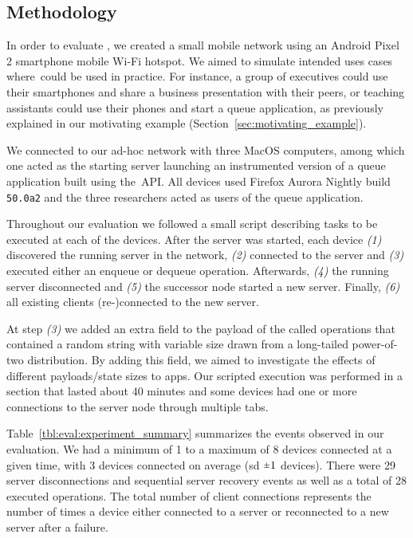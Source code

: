 \subsection{Methodology}
\label{sub:eval:evaluation_methodology}

In order to evaluate \APINameNoSpace, we created a small mobile network using an Android Pixel 2 smartphone mobile Wi-Fi hotspot.
We aimed to simulate intended uses cases where~\APIName could be used in practice. 
For instance, a group of executives could use their smartphones and share a business presentation with their peers, or teaching assistants could use their phones and start a queue application, as previously explained in our motivating example (Section~\ref{sec:motivating_example}).


We connected to our ad-hoc network with three MacOS computers, among which one acted as the starting server launching an instrumented version of a queue application built using the~\APIName API. 
All devices used Firefox Aurora Nightly build {\texttt{50.0a2}} and the three researchers acted as users of the queue application.


Throughout our evaluation we followed a small script describing tasks to be executed at each of the devices. 
After the server was started, each device
{\it (1)} discovered the running server in the network,
{\it (2)} connected to the server and
{\it (3)} executed either an enqueue or dequeue operation.
Afterwards,  
{\it (4)} the running server disconnected and 
{\it (5)} the successor node started a new server.
Finally, 
{\it (6)} all existing clients (re-)connected to the new server.

At step {\it (3)} we added an extra field to the payload of the called operations that contained a random string with variable size drawn from a long-tailed power-of-two distribution. 
By adding this field, we aimed to investigate the effects of different payloads/state sizes to \APIshort apps.
Our scripted execution was performed in a section that lasted about 40 minutes and some devices had one or more connections to the server node through multiple tabs.


Table~\ref{tbl:eval:experiment_summary} summarizes the events observed in our evaluation.
We had a minimum of 1 to a maximum of 8 devices connected at a given time, with 3 devices connected on average (sd $\rpm 1$ devices). 
There were 29 server disconnections and sequential server recovery events as well as a total of  28 executed operations. 
The total number of client connections represents the number of times a device either connected to a server or reconnected to a new server after a failure.

